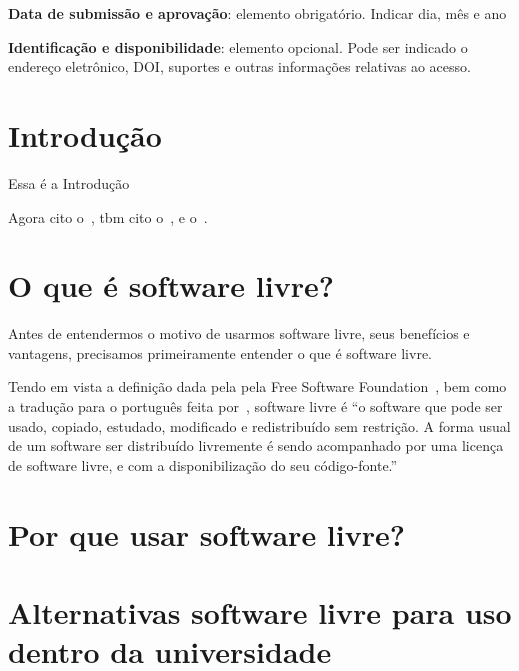 \documentclass[
	article,			%
	12pt,				%
	oneside,			%
	a4paper,			%
	english,			%
	brazil,				%
	sumario=tradicional
	]{abntex2}
\begin{document}

\begin{center}\smaller
\textbf{Data de submissão e aprovação}: elemento obrigatório. Indicar dia, mês e ano

\textbf{Identificação e disponibilidade}: elemento opcional. Pode ser indicado 
o endereço eletrônico, DOI, suportes e outras informações relativas ao acesso.
\end{center}

\textual
\section{Introdução}\label{Introdução}

Essa é a Introdução

Agora cito o~\cite{definicao}, tbm cito o~\cite{uso_de_linux}, e o~\cite{vantagens}.

\cite{site-fsf}

\section{O que é software livre?}\label{O que é software livre?}
Antes de entendermos o motivo de usarmos software livre, seus benefícios e vantagens, precisamos primeiramente entender o que é software livre.

Tendo em vista a definição dada pela pela Free Software Foundation~\cite{site-fsf}, bem como a tradução para o português feita por~\cite{definicao}, software livre é ``o software que pode ser usado, copiado, estudado, modificado e redistribuído sem restrição. A forma usual de um software ser distribuído livremente é sendo acompanhado por uma licença de software livre, e com a disponibilização do seu código-fonte.''

\section{Por que usar software livre?}\label{Por que usar software livre?}

\section{Alternativas software livre para uso dentro da universidade}\label{Alternativas software livre para uso dentro da universidade}
\end{document}

